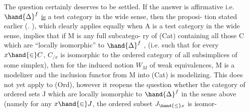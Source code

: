 The question certainly deserves to be settled. If the answer is
affirmative i.e. $\hand{\Delta}^{f}$ \uline{is} a test category in the wide sense, then\unsure{\hand{,}} the proposi-%
\margin{-} tion stated earlier (\hand{\S}. ), which clearly applies equally when A is a
test category in the wide sense, implies that if M is any full subcatego-%
ry of (Cat) containing all those C which are ``locally isomorphic'' to $\hand{\Delta}^{f}$ ,
(i.e. such that for every $x \hand{\in} C$, $C_{/x}$ is isomorphic to the ordered category
of all subsimplices of some simplex), then for the induced notion $W_M$ of
weak equivalences, M is a modelizer and the inclusion functor from M into
(Cat) is modelizing. This does not yet apply to (Ord), however it reopens
the question whether the category of  
 ordered sets J which are locally isomorphic to $\hand{\Delta}^{f}$ in the
sense above (namely for any $x \hand{\in} J$, the  ordered subset $J_{\hand{\leq} x}$ is isomor-%
